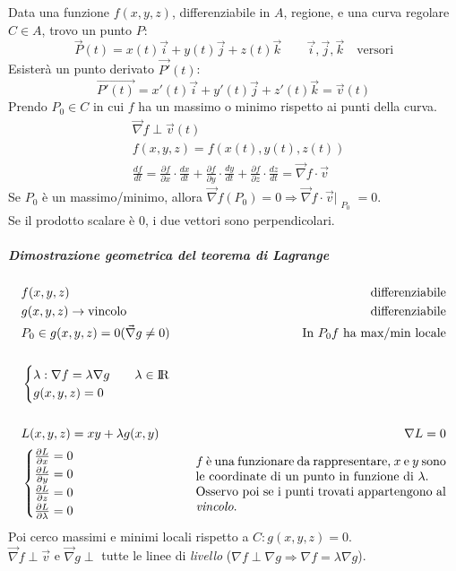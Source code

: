 \documentclass[10pt,a4paper,fleqn]{article}
\begin{document}
	Data una funzione $f(x,y,z)$, differenziabile in $A$, regione, e una curva regolare $C\in A$, trovo un punto $P$:
	\begin{equation}
	\vec{P}(t)=x(t)\vec{i}+y(t)\vec{j}+z(t)\vec{k} \qquad \vec{i},\vec{j},\vec{k} \quad \text{versori}
	\end{equation}
	Esisterà un punto derivato $\vec{P'}(t)$:
	\begin{equation}
	\vec{P'(t)}=x'(t)\vec{i}+y'(t)\vec{j}+z'(t)\vec{k} = \vec{v}(t)
	\end{equation}
	Prendo $P_0 \in C$ in cui $f$ ha un massimo o minimo rispetto ai punti della curva.
	\begin{equation}
	\begin{split}
	&\vec{\nabla}f \perp \vec{v}(t)\\
	&f(x,y,z)=f(x(t),y(t),z(t))\\
	&\frac{df}{dt}=\frac{\partial f}{\partial x}\cdot\frac{dx}{dt}+\frac{\partial f}{\partial y}\cdot\frac{dy}{dt}+\frac{\partial f}{\partial z}\cdot\frac{dz}{dt}=\vec{\nabla}f\cdot\vec{v}
	\end{split}
	\end{equation}
	Se $P_0$ è un massimo/minimo, allora $\vec{\nabla}f(P_0)=0 \Rightarrow \vec{\nabla}f\cdot\vec{v}\Bigr|_{\substack{P_0}} = 0$.\\
	Se il prodotto scalare è $0$, i due vettori sono perpendicolari.
	\subparagraph{Dimostrazione geometrica del teorema di Lagrange}
	\begin{equation}
	\begin{split}
	&f(x,y,z)\hfill&\text{differenziabile}\\
	&g(x,y,z)\rightarrow \text{vincolo} &\text{differenziabile}\\
	&P_0 \in g(x,y,z)=0 (\vec{\nabla}g\neq 0) &\text{In $P_0 f$ ha max/min locale}\\\\
	&\begin{cases}
	\lambda: \nabla f = \lambda \nabla g \qquad\lambda \in \rm I\!R\\
	g(x,y,z)=0
	\end{cases}\\\\
	&L(x,y,z)=xy+\lambda g(x,y) &\nabla L=0\\
	&\begin{cases}
	\frac{\partial L}{\partial x}=0\\
	\frac{\partial L}{\partial y}=0\\
	\frac{\partial L}{\partial z}=0\\
	\frac{\partial L}{\partial \lambda}=0
	\end{cases} &\parbox{200pt}{$f$ è una funzionare da rappresentare, $x$ e $y$ sono le coordinate di un punto in funzione di $\lambda$.\\Osservo poi se i punti trovati appartengono al \emph{vincolo}.}
	\end{split}
	\end{equation}
	\indent Poi cerco massimi e minimi locali rispetto a $C: g(x,y,z)=0$.\\
	\indent $\vec{\nabla}f \perp \vec{v}$ e $\vec{\nabla}g \perp$ tutte le linee di \textit{livello} ($\nabla f \perp \nabla g \Rightarrow \nabla f = \lambda\nabla g$).
\end{document}
